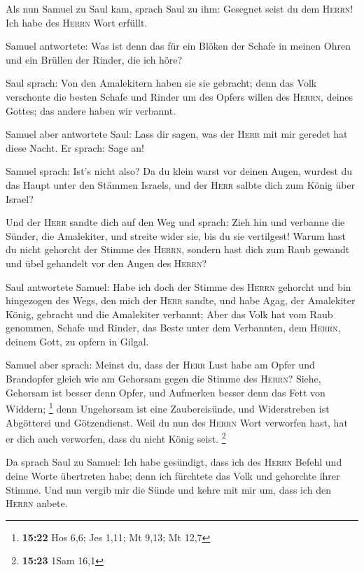  Als nun Samuel zu Saul kam, sprach Saul zu ihm: Gesegnet
seist du dem \textsc{Herrn}! Ich habe des \textsc{Herrn} Wort erfüllt.

 Samuel antwortete: Was ist denn das für ein Blöken der
Schafe in meinen Ohren und ein Brüllen der Rinder, die ich höre?

 Saul sprach: Von den Amalekitern haben sie sie gebracht;
denn das Volk verschonte die besten Schafe und Rinder um des Opfers
willen des \textsc{Herrn}, deines Gottes; das andere haben wir verbannt.

 Samuel aber antwortete Saul: Lass dir sagen, was der
\textsc{Herr} mit mir geredet hat diese Nacht. Er sprach: Sage an!

 Samuel sprach: Ist's nicht also? Da du klein warst vor
deinen Augen, wurdest du das Haupt unter den Stämmen Israels, und der
\textsc{Herr} salbte dich zum König über Israel?

 Und der \textsc{Herr} sandte dich auf den Weg und
sprach: Zieh hin und verbanne die Sünder, die Amalekiter, und streite
wider sie, bis du sie vertilgest!  Warum hast du nicht
gehorcht der Stimme des \textsc{Herrn}, sondern hast dich zum Raub
gewandt und übel gehandelt vor den Augen des \textsc{Herrn}?

 Saul antwortete Samuel: Habe ich doch der Stimme des
\textsc{Herrn} gehorcht und bin hingezogen des Wegs, den mich der
\textsc{Herr} sandte, und habe Agag, der Amalekiter König, gebracht und
die Amalekiter verbannt;  Aber das Volk hat vom Raub
genommen, Schafe und Rinder, das Beste unter dem Verbannten, dem
\textsc{Herrn}, deinem Gott, zu opfern in Gilgal.

 Samuel aber sprach: Meinst du, dass der \textsc{Herr}
Lust habe am Opfer und Brandopfer gleich wie am Gehorsam gegen die
Stimme des \textsc{Herrn}? Siehe, Gehorsam ist besser denn Opfer, und
Aufmerken besser denn das Fett von Widdern; \footnote{\textbf{15:22} Hos
  6,6; Jes 1,11; Mt 9,13; Mt 12,7}  denn Ungehorsam ist
eine Zaubereisünde, und Widerstreben ist Abgötterei und Götzendienst.
Weil du nun des \textsc{Herrn} Wort verworfen hast, hat er dich auch
verworfen, dass du nicht König seist. \footnote{\textbf{15:23} 1Sam 16,1}

 Da sprach Saul zu Samuel: Ich habe gesündigt, dass ich
des \textsc{Herrn} Befehl und deine Worte übertreten habe; denn ich
fürchtete das Volk und gehorchte ihrer Stimme.  Und nun
vergib mir die Sünde und kehre mit mir um, dass ich den \textsc{Herrn}
anbete.

